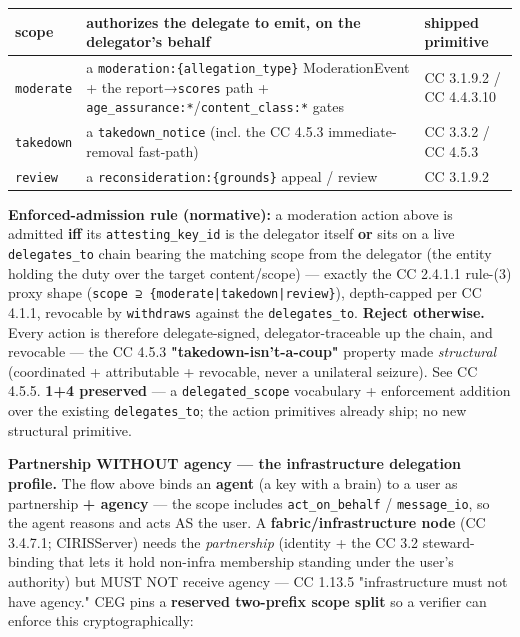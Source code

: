 \documentclass[11pt]{article}
\begin{document}
{\footnotesize
\begin{longtable}{|p{5.33cm}|p{5.33cm}|p{5.33cm}|}\hline
\textbf{scope} & \textbf{authorizes the delegate to emit, on the delegator's behalf} & \textbf{shipped primitive} \\ \hline\endhead
\texttt{moderate} & a \texttt{moderation:\{allegation\_type\}} ModerationEvent + the report→\texttt{scores} path + \texttt{age\_assurance:*}/\texttt{content\_class:*} gates & CC 3.1.9.2 / CC 4.4.3.10 \\ \hline
\texttt{takedown} & a \texttt{takedown\_notice} (incl. the CC 4.5.3 immediate-removal fast-path) & CC 3.3.2 / CC 4.5.3 \\ \hline
\texttt{review} & a \texttt{reconsideration:\{grounds\}} appeal / review & CC 3.1.9.2 \\ \hline
\end{longtable}}


\textbf{Enforced-admission rule (normative):} a moderation action above is admitted \textbf{iff} its \texttt{attesting\_key\_id} is the delegator itself \textbf{or} sits on a live \texttt{delegates\_to} chain bearing the matching scope from the delegator (the entity holding the duty over the target content/scope) — exactly the CC 2.4.1.1 rule-(3) proxy shape (\texttt{scope ⊇ \{moderate|takedown|review\}}), depth-capped per CC 4.1.1, revocable by \texttt{withdraws} against the \texttt{delegates\_to}. \textbf{Reject otherwise.} Every action is therefore delegate-signed, delegator-traceable up the chain, and revocable — the CC 4.5.3 \textbf{"takedown-isn't-a-coup"} property made \textit{structural} (coordinated + attributable + revocable, never a unilateral seizure). See CC 4.5.5. \textbf{1+4 preserved} — a \texttt{delegated\_scope} vocabulary + enforcement addition over the existing \texttt{delegates\_to}; the action primitives already ship; no new structural primitive.


\textbf{Partnership WITHOUT agency — the infrastructure delegation profile.} The flow above binds an \textbf{agent} (a key with a brain) to a user as partnership \textbf{+ agency} — the scope includes \texttt{act\_on\_behalf} / \texttt{message\_io}, so the agent reasons and acts AS the user. A \textbf{fabric/infrastructure node} (CC 3.4.7.1; CIRISServer) needs the \textit{partnership} (identity + the CC 3.2 steward-binding that lets it hold non-infra membership standing under the user's authority) but MUST NOT receive agency — CC 1.13.5 "infrastructure must not have agency." CEG pins a \textbf{reserved two-prefix scope split} so a verifier can enforce this cryptographically:
\end{document}
